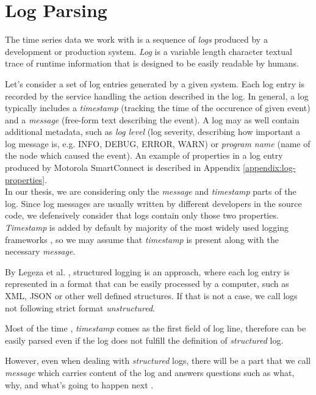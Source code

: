 \section{Log Parsing}

The time series data we work with is a sequence of \textit{logs} produced by a development or production system. 
\textit{Log} is a variable length character textual trace of runtime information that is designed to be easily readable by humans.

Let's consider a set of log entries generated by a given system. Each log entry is recorded by the service handling the action described in the log. In general, a log typically includes a \textit{timestamp} (tracking the time of the occurence of given event) and a \textit{message} (free-form text describing the event). A log may as well contain additional metadata, such as \textit{log level} (log severity, describing how important a log message is, e.g. INFO, DEBUG, ERROR, WARN) or \textit{program name} (name of the node which caused the event). An example of properties in a log entry produced by Motorola SmartConnect is described in Appendix \ref{appendix:log-properties}.\\

In our thesis, we are considering only the \textit{message} and \textit{timestamp} parts of the log. Since log messages are usually written by different developers in the source code, we defensively consider that logs contain only those two properties. \textit{Timestamp} is added by default by majority of the most widely used logging frameworks \cite{log4j:example} \cite{serilog:example} \cite{python_log:example}, so we may assume that \textit{timestamp} is present along with the necessary \textit{message}.

By Legeza et al. \cite{structured_logging}, structured logging is an approach, where each log entry is represented in a format that can be easily processed by a computer, such as XML, JSON or other well defined structures. If that is not a case, we call logs not following strict format \textit{unstructured}.

Most of the time \cite{log4j:example} \cite{serilog:example} \cite{python_log:example}, \textit{timestamp} comes as the first field of log line, therefore can be easily parsed even if the log does not fulfill the definition of \textit{structured} log.

However, even when dealing with \textit{structured} logs, there will be a part that we call \textit{message} which carries content of the log and answers questions such as what, why, and what's going to happen next \cite{structured_logging}.\\

